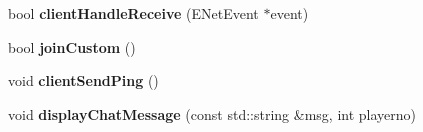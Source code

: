 \begin{DoxyCompactItemize}
\item 
\hypertarget{classNetwork_a183e48488c63532c8672d85cb3b22ea7}{
bool {\bfseries client\-Handle\-Receive} (\-E\-Net\-Event $\ast$event)}
\label{d5/d16/classNetwork_a183e48488c63532c8672d85cb3b22ea7}

\item 
\hypertarget{classNetwork_a3187fc0a5a97d371e356defc773b155a}{
bool {\bfseries join\-Custom} ()}
\label{d5/d16/classNetwork_a3187fc0a5a97d371e356defc773b155a}

\item 
\hypertarget{classNetwork_a759454d790f1bb80fbb6ef6f7734d8d3}{
void {\bfseries client\-Send\-Ping} ()}
\label{d5/d16/classNetwork_a759454d790f1bb80fbb6ef6f7734d8d3}

\item 
\hypertarget{classNetwork_aa11e7d1ad5db08f98e8f5b73f4d3aa6f}{
void {\bfseries display\-Chat\-Message} (const std\-::string \&msg, int playerno)}
\label{d5/d16/classNetwork_aa11e7d1ad5db08f98e8f5b73f4d3aa6f}

\end{DoxyCompactItemize}
